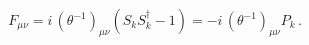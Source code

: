 \begin{equation}
F_{\mu\nu}= i\,(\theta^{-1})_{\mu\nu}(S_kS_k^{\dagger}-1)= 
-i\,(\theta^{-1})_{\mu\nu}P_k\,.\label{eq:5.16}
\end{equation}

